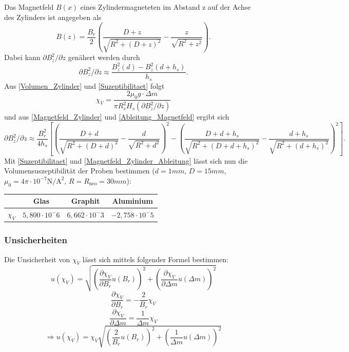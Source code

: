 \documentclass[
	a4paper,
	12pt,
	pagesize,
	ngerman
]{scrartcl}
\begin{document}
	Das Magnetfeld $B(x)$ eines Zylindermagneteten im Abstand z auf der Achse des Zylinders ist angegeben als
	\begin{equation}
	\label{Magnetfeld_Zylinder}
	B(z)=\frac{B_r}{2}\left( \frac{D+z}{\sqrt{R^2+(D+z)^2}}-\frac{z}{\sqrt{R^2 +z^2}}\right).
	\end{equation}
	Dabei kann $\partial B_z^2 /\partial z$ genähert werden durch 
	\begin{equation}
	\label{Ableitung_Magnetfeld}
	\partial B_z^2 /\partial z \approx \frac{B_z^2(d) - B_z^2(d+h_s)}{h_s}.
	\end{equation} 
	Aus \cref{Volumen_Zylinder} und \cref{Suzeptibilitaet} folgt
	\begin{equation}
	\chi_V=\frac{2 \mu_0 g \cdot \Delta m}{\pi R_s^2 H_s(\partial B_z^2 /\partial z)}
	\end{equation}
	und aus \cref{Magnetfeld_Zylinder} und \cref{Ableitung_Magnetfeld} ergibt sich
		\begin{equation}
	\label{Magnetfeld_Zylinder_Ableitung}
	\partial B_z^2 /\partial z \approx \frac{B_r^2}{4h_s} \left[ \left( \frac{D+d}{\sqrt{R^2+(D+d)^2}}-\frac{d}{\sqrt{R^2 +d^2}}\right)^2 -\left( \frac{D+d+h_s}{\sqrt{R^2+(D+d+h_s)^2}} -\frac{d+h_s}{\sqrt{R^2+(d+h_s)^2}} \right)^2  \right].
	\end{equation}
	Mit \cref{Suzeptibilitaet} und \cref{Magnetfeld_Zylinder_Ableitung} lässt sich nun die Volumensuszeptibilität der Proben bestimmen ($d=1 \si{mm}$, $D=15 \si{mm}$, $ \mu_0 = 4 \pi \cdot 10^{-7} \si{\newton \per \ampere \squared}$, $R=R_\text{neo}=30 \si{mm}$): \newline
	\begin{tabular}{ r | c | c | c}
		& Glas & Graphit & Aluminium \\ \hline
		$\chi_V $ &$5,800 \cdot 10^-6$&$6,662 \cdot 10^-3$&$-2,758 \cdot 10^-5$\\ \hline
	\end{tabular} \newline
	
	\subsubsection*{Unsicherheiten}
	
	Die Unsicherheit von $\chi_V$ lässt sich mittels folgender Formel bestimmen:
	\begin{equation}
		u(\chi_V) = \sqrt{(\frac{\partial\chi_V}{\partial B_r}u(B_r))^2 + (\frac{\partial\chi_V}{\partial\Delta m}u(\Delta m))^2}
	\end{equation}
	\begin{equation}
		\frac{\partial\chi_V}{\partial B_r} =  -\frac{2}{B_r}\chi_V
	\end{equation}
	\begin{equation}
		\frac{\partial\chi_V}{\partial \Delta m} =  \frac{1}{\Delta m}\chi_V
	\end{equation}
	\begin{equation}
		\Rightarrow u(\chi_V) = \chi_V\sqrt{(\frac{2}{B_r}u(B_r))^2 + (\frac{1}{\Delta m}u(\Delta m))^2}
	\end{equation}
	
\end{document}

